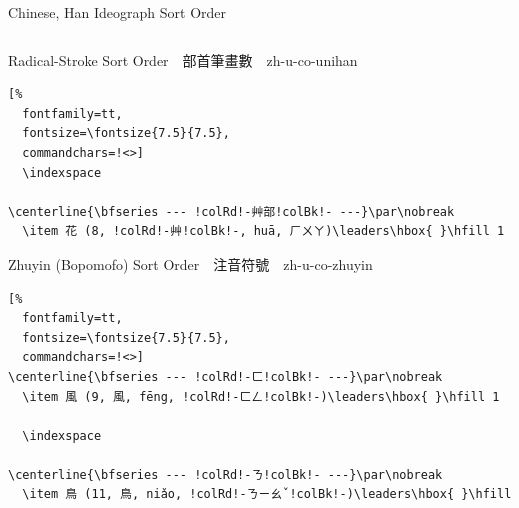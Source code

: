 \documentclass[aspectratio=169,10pt]{beamer}
\begin{document}
\begin{frame}[fragile]{Chinese, Han Ideograph Sort Order}
\begin{columns}
\begin{column}{73mm}
\begin{exampleblock}{Radical-Stroke {\footnotesize Sort Order~~部首筆畫數~~\scriptsize zh-u-co-unihan}}
\begin{Verbatim}[%
  fontfamily=tt,
  fontsize=\fontsize{7.5}{7.5},
  commandchars=!<>]
  \indexspace

\centerline{\bfseries --- !colRd!-艸部!colBk!- ---}\par\nobreak
  \item 花 (8, !colRd!-艸!colBk!-, huā, ㄏㄨㄚ)\leaders\hbox{ }\hfill 1
\end{Verbatim}
\end{exampleblock}
\begin{exampleblock}{Zhuyin {\footnotesize (Bopomofo) Sort Order~~注音符號~~\scriptsize zh-u-co-zhuyin}}
\makeatletter
\def\verbatim@font{\fontsize{7.5}{7.5}\selectfont\textjapanese}
\makeatother
\begin{Verbatim}[%
  fontfamily=tt,
  fontsize=\fontsize{7.5}{7.5},
  commandchars=!<>]
\centerline{\bfseries --- !colRd!-ㄈ!colBk!- ---}\par\nobreak
  \item 風 (9, 風, fēng, !colRd!-ㄈㄥ!colBk!-)\leaders\hbox{ }\hfill 1

  \indexspace

\centerline{\bfseries --- !colRd!-ㄋ!colBk!- ---}\par\nobreak
  \item 鳥 (11, 鳥, niǎo, !colRd!-ㄋㄧㄠˇ!colBk!-)\leaders\hbox{ }\hfill
\end{Verbatim}
\end{exampleblock}
\end{column}
\end{columns}
\end{frame}

\end{document}
